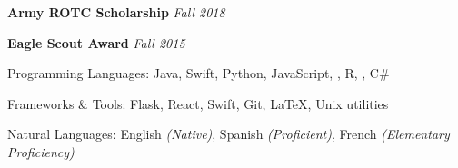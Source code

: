 \documentclass[10pt,letterpaper]{article}
\begin{document}
\spacedhrule{0.5em}{-0.4em}


\headedsection
  {\textbf{Army ROTC Scholarship}}
  {\emph{Fall 2018}}
  {}

\headedsection
  {\textbf{Eagle Scout Award}}
  {\emph{Fall 2015}}
  {}

\spacedhrule{0.5em}{-0.4em}


\inlineheadsection
  {Programming Languages:}
  {Java, Swift, Python, JavaScript, , R, , C\#}

\inlineheadsection
  {Frameworks \& Tools:}
  {Flask, React, Swift, Git, \LaTeX, Unix utilities}

\inlineheadsection
  {Natural Languages:}
  {English \emph{(Native)}, Spanish \emph{(Proficient)}, French \emph{(Elementary Proficiency)}}
\end{document}
